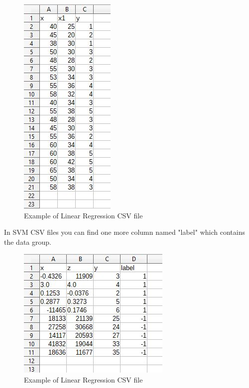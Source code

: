 \begin{figure}[H]
		\centering
		\includegraphics[scale=0.70]{../Developer_manual/img/linear_regression_csv.jpg}
		\caption{Example of Linear Regression CSV file}
	\end{figure}

In SVM CSV files you can find one more column named "label" which contains the data group. 

\begin{figure}[H]
		\centering
		\includegraphics[scale=0.70]{../Developer_manual/img/support_vector_machine_csv.jpg}
		\caption{Example of Linear Regression CSV file}
	\end{figure}
 



